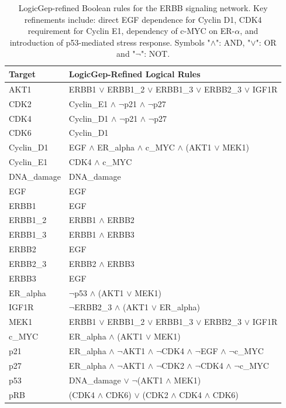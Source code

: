 \documentclass[a4paper,12pt]{article}
\begin{document}
\begin{table}[htbp!]
    \centering
    \begin{tabular}{lp{}}
        \toprule
        \textbf{Target} & \textbf{LogicGep-Refined Logical Rules} \\ 
        \midrule
        AKT1 & ERBB1 $\vee$ ERBB1\_2 $\vee$ ERBB1\_3 $\vee$ ERBB2\_3 $\vee$ IGF1R \\ 
        CDK2 & Cyclin\_E1 $\wedge$ $\neg$p21 $\wedge$ $\neg$p27 \\ 
        CDK4 & Cyclin\_D1 $\wedge$ $\neg$p21 $\wedge$ $\neg$p27 \\ 
        CDK6 & Cyclin\_D1 \\ 
        Cyclin\_D1 & EGF $\wedge$ ER\_alpha $\wedge$ c\_MYC $\wedge$ (AKT1 $\vee$ MEK1) \\ 
        Cyclin\_E1 & CDK4 $\wedge$ c\_MYC \\ 
        DNA\_damage & DNA\_damage \\ 
        EGF & EGF \\ 
        ERBB1 & EGF \\ 
        ERBB1\_2 & ERBB1 $\wedge$ ERBB2 \\ 
        ERBB1\_3 & ERBB1 $\wedge$ ERBB3 \\ 
        ERBB2 & EGF \\ 
        ERBB2\_3 & ERBB2 $\wedge$ ERBB3 \\ 
        ERBB3 & EGF \\ 
        ER\_alpha & $\neg$p53 $\wedge$ (AKT1 $\vee$ MEK1) \\ 
        IGF1R & $\neg$ERBB2\_3 $\wedge$ (AKT1 $\vee$ ER\_alpha) \\ 
        MEK1 & ERBB1 $\vee$ ERBB1\_2 $\vee$ ERBB1\_3 $\vee$ ERBB2\_3 $\vee$ IGF1R \\ 
        c\_MYC & ER\_alpha $\wedge$ (AKT1 $\vee$ MEK1) \\ 
        p21 & ER\_alpha $\wedge$ $\neg$AKT1 $\wedge$ $\neg$CDK4 $\wedge$ $\neg$EGF $\wedge$ $\neg$c\_MYC \\ 
        p27 & ER\_alpha $\wedge$ $\neg$AKT1 $\wedge$ $\neg$CDK2 $\wedge$ $\neg$CDK4 $\wedge$ $\neg$c\_MYC \\ 
        p53 & DNA\_damage $\vee$ $\neg$(AKT1 $\wedge$ MEK1) \\ 
        pRB & (CDK4 $\wedge$ CDK6) $\vee$ (CDK2 $\wedge$ CDK4 $\wedge$ CDK6) \\
        \bottomrule
    \end{tabular}
    \caption{LogicGep-refined Boolean rules for the ERBB signaling network. Key refinements include: direct EGF dependence for Cyclin D1, CDK4 requirement for Cyclin E1, dependency of c-MYC on ER-$\alpha$, and introduction of p53-mediated stress response. Symbols "$\wedge$": AND, "$\vee$": OR and "$\neg$": NOT.}
    \label{tab:logicgep_rules}
\end{table}
\end{document}

